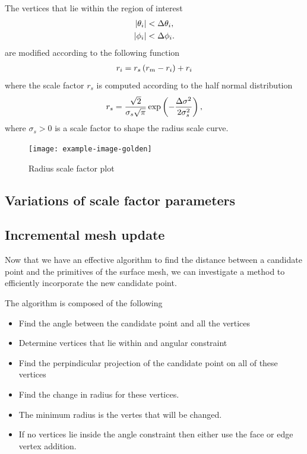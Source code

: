 The vertices that lie within the region of interest
\begin{align*}
    \left| \theta_i \right| &< \Delta \theta_i,  \\
    \left| \phi_i \right| &< \Delta \phi_i .
\end{align*}
are modified according to the following function
\begin{align}
    r_i = r_s \left( r_m - r_i \right) + r_i
\end{align}
where the scale factor \( r_s\) is computed according to the half normal distribution
\begin{align}
    r_s = \frac{\sqrt{2}}{\sigma_s \sqrt{\pi}} \exp \left(  - \frac{\Delta \sigma^2}{2 \sigma_s^2}  \right) ,
\end{align}
where \( \sigma_s > 0 \) is a scale factor to shape the radius scale curve.
\begin{figure}
    \centering
    \texttt{[image: example-image-golden]}
    \caption{Radius scale factor plot~\label{fig:radius_scale_factor}}
\end{figure}

\subsection{Variations of scale factor parameters}


\subsection{Incremental mesh update}

Now that we have an effective algorithm to find the distance between a candidate point and the primitives of the surface mesh, we can investigate a method to efficiently incorporate the new candidate point.

The algorithm is composed of the following

\begin{itemize}
    \item Find the angle between the candidate point and all the vertices
    \item Determine vertices that  lie within and angular constraint
    \item Find the perpindicular projection of the candidate point on all of these vertices
    \item Find the change in radius for these vertices. 
    \item The minimum radius is the vertes that will be changed.
    \item If no vertices lie inside the angle constraint then either use the face or edge vertex addition.
\end{itemize}
